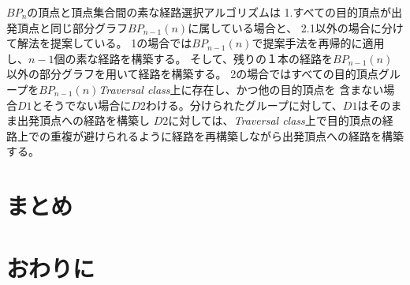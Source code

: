 \documentclass[11pt,a4j]{jsarticle}
\theoremstyle{plain}
\begin{document}
$BP_n$の頂点と頂点集合間の素な経路選択アルゴリズムは
1.すべての目的頂点が出発頂点と同じ部分グラフ$BP_{n-1}(n)$に属している場合と、
2.1以外の場合に分けて解法を提案している。
1の場合では$BP_{n-1}(n)$で提案手法を再帰的に適用し、$n-1$個の素な経路を構築する。
そして、残りの１本の経路を$BP_{n-1}(n)$以外の部分グラフを用いて経路を構築する。
2の場合ではすべての目的頂点グループを$BP_{n-1}(n)${\it Traversal class}上に存在し、かつ他の目的頂点を
含まない場合$D1$とそうでない場合に$D2$わける。分けられたグループに対して、$D1$はそのまま出発頂点への経路を構築し
$D2$に対しては、{\it Traversal class}上で目的頂点の経路上での重複が避けられるように経路を再構築しながら出発頂点への経路を構築する。



\newpage
\section{まとめ}
 \section{おわりに}
  
  \newpage
 \begin{comment}
シェアソート
シェアソート（英: shear-sort）は、ソートのアルゴリズムの一つ。シェアソートでは、データを長方形に並べた上で、各行／各列ごとにソートを行なう。1989年に Isaac D. Scherson らが発表した[1]。安定ではない内部ソートであり、最悪の場合の時間計算量はO(n1.5)である。各行／各列の比較は互いに独立であるため、バブルソートとは異なり、並列動作が可能である。

Deterministic Oblivious Routing
http://algo.rwth-aachen.de/Lehre/SS12/VTDS/oblivious(1).pdf

インターコネクション技術
http://www.ieice-hbkb.org/files/06/06gun_05hen_09.pdf

残余ネットワーク
http://even-eko.hatenablog.com/entry/2013/08/08/195120
\end{comment}
  
\end{document}
